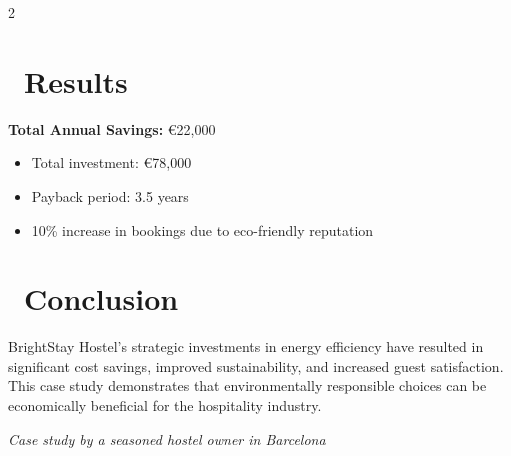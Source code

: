 \documentclass[12pt,a4paper]{article}
\begin{document}
\begin{multicols}{2}
\section*{\faChartLine\ Results}
\textbf{Total Annual Savings:} €22,000
\begin{itemize}
\item Total investment: €78,000
\item Payback period: 3.5 years
\item 10\% increase in bookings due to eco-friendly reputation
\end{itemize}

\section*{\faCheckCircle\ Conclusion}
BrightStay Hostel's strategic investments in energy efficiency have resulted in significant cost savings, improved sustainability, and increased guest satisfaction. This case study demonstrates that environmentally responsible choices can be economically beneficial for the hospitality industry.

\end{multicols}

\vfill
\begin{flushright}
\textit{Case study by a seasoned hostel owner in Barcelona}
\end{flushright}
\end{document}
